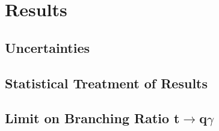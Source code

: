 
\chapter{Results}
\label{ch:Results}
\section{Uncertainties}
\section{Statistical Treatment of Results}
\section{Limit on Branching Ratio t$\rightarrow$q$\gamma$}



